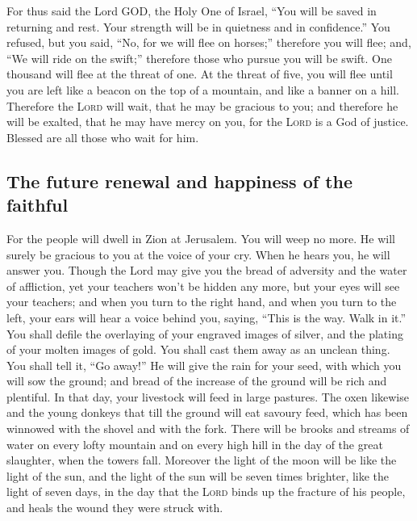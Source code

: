  For thus said the Lord GOD, the Holy One of Israel,
``You will be saved in returning and rest. Your strength will be in
quietness and in confidence.'' You refused,  but you
said, ``No, for we will flee on horses;'' therefore you will flee; and,
``We will ride on the swift;'' therefore those who pursue you will be
swift.  One thousand will flee at the threat of one. At
the threat of five, you will flee until you are left like a beacon on
the top of a mountain, and like a banner on a hill. 
Therefore the \textsc{Lord} will wait, that he may be gracious to you;
and therefore he will be exalted, that he may have mercy on you, for the
\textsc{Lord} is a God of justice. Blessed are all those who wait for
him.

\hypertarget{the-future-renewal-and-happiness-of-the-faithful}{%
\subsection{The future renewal and happiness of the
faithful}\label{the-future-renewal-and-happiness-of-the-faithful}}

 For the people will dwell in Zion at Jerusalem. You will
weep no more. He will surely be gracious to you at the voice of your
cry. When he hears you, he will answer you.  Though the
Lord may give you the bread of adversity and the water of affliction,
yet your teachers won't be hidden any more, but your eyes will see your
teachers;  and when you turn to the right hand, and when
you turn to the left, your ears will hear a voice behind you, saying,
``This is the way. Walk in it.''  You shall defile the
overlaying of your engraved images of silver, and the plating of your
molten images of gold. You shall cast them away as an unclean thing. You
shall tell it, ``Go away!''  He will give the rain for
your seed, with which you will sow the ground; and bread of the increase
of the ground will be rich and plentiful. In that day, your livestock
will feed in large pastures.  The oxen likewise and the
young donkeys that till the ground will eat savoury feed, which has been
winnowed with the shovel and with the fork.  There will
be brooks and streams of water on every lofty mountain and on every high
hill in the day of the great slaughter, when the towers fall.
 Moreover the light of the moon will be like the light of
the sun, and the light of the sun will be seven times brighter, like the
light of seven days, in the day that the \textsc{Lord} binds up the
fracture of his people, and heals the wound they were struck with.

